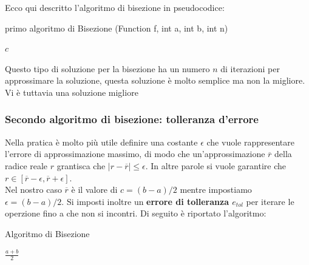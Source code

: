 Ecco qui descritto l'algoritmo di bisezione in pseudocodice:

\begin{algorithm}[H]
    \caption{primo algoritmo di Bisezione (Function f, int a, int b, int n)}



    \Return $c$
\end{algorithm}

Questo tipo di soluzione per la bisezione ha un numero $n$ di iterazioni per approssimare la soluzione, questa soluzione è molto semplice ma non la migliore. Vi è tuttavia una soluzione migliore

\subsubsection{Secondo algoritmo di bisezione: tolleranza d'errore}
Nella pratica è molto più utile definire una costante $\epsilon$ che vuole rappresentare l'errore di approssimazione massimo, di modo che un'approssimazione $\overline{r}$ della radice reale $r$ grantisca che $|r- \overline{r}| \leq \epsilon$. In altre parole si vuole garantire che $r\in [\overline{r}-\epsilon,\overline{r}+\epsilon]$. \\ Nel nostro caso $\overline{r}$ è il valore di $c=(b-a)/2$ mentre impostiamo $\epsilon = (b-a)/2$. Si imposti inoltre un \textbf{errore di tolleranza $e_{tol}$}  per iterare le operzione fino a che non si incontri. Di seguito è riportato l'algoritmo:

\begin{algorithm}[H]
    \caption{Algoritmo di Bisezione}
    \Return $\frac{a + b}{2}$\; 
\end{algorithm}

